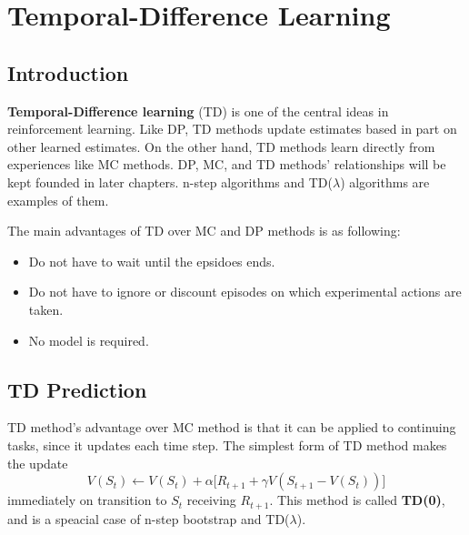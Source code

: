 \documentclass[../../main.tex]{subfiles}
\begin{document}
\chapter{Temporal-Difference Learning}

\section{Introduction}
    \textbf{Temporal-Difference learning} (TD) is one of the central ideas in reinforcement learning.
    Like DP, TD methods update estimates based in part on other learned estimates. On the other hand, TD methods learn
    directly from experiences like MC methods. DP, MC, and TD methods' relationships will be kept founded in later chapters.
    n-step algorithms and TD($\lambda$) algorithms are examples of them.

    The main advantages of TD over MC and DP methods is as following:
    \begin{itemize}
        \item Do not have to wait until the epsidoes ends.
        \item Do not have to ignore or discount episodes on which experimental actions are taken. 
        \item No model is required.
    \end{itemize}

\section{TD Prediction}
    TD method's advantage over MC method is that it can be applied to continuing tasks, since it updates each time step.
    The simplest form of TD method makes the update
    \begin{equation}
        V(S_t) \leftarrow V(S_t) + \alpha \Big[ R_{t+1} + \gamma V(S_{t+1} - V(S_t))\Big] \label{eq:TDUpdate}
    \end{equation}
    immediately on transition to $S_t$ receiving $R_{t+1}$. This method is called \textbf{TD(0)}, and is a speacial case of n-step bootstrap and TD($\lambda$).
\end{document}
